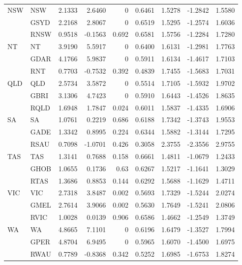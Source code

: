 \begin{table}[htbp]
{\begin{tabular}{llrrrrrrr}
    \multirow{3}[0]{*}{NSW} & NSW   & 2.1333 & 2.6460 & 0     & 0.6461 & 1.5278 & -1.2842 & 1.5580 \\
          & GSYD  & 2.2168 & 2.8067 & 0     & 0.6519 & 1.5295 & -1.2574 & 1.6036 \\
          & RNSW  & 0.9518 & -0.1563 & 0.692 & 0.6581 & 1.5756 & -1.2284 & 1.7280 \\
    \multirow{3}[0]{*}{NT} & NT    & 3.9190 & 5.5917 & 0     & 0.6400 & 1.6131 & -1.2981 & 1.7763 \\
          & GDAR  & 4.1766 & 5.9837 & 0     & 0.5911 & 1.6134 & -1.4617 & 1.7103 \\
          & RNT   & 0.7703 & -0.7532 & 0.392 & 0.4839 & 1.7455 & -1.5683 & 1.7031 \\
    \multirow{3}[0]{*}{QLD} & QLD   & 2.5734 & 3.5872 & 0     & 0.5514 & 1.7105 & -1.5932 & 1.9702 \\
          & GBRI  & 3.1306 & 4.7423 & 0     & 0.5910 & 1.6443 & -1.4526 & 1.8635 \\
          & RQLD  & 1.6948 & 1.7847 & 0.024 & 0.6011 & 1.5837 & -1.4335 & 1.6906 \\
    \multirow{3}[0]{*}{SA} & SA    & 1.0761 & 0.2219 & 0.686 & 0.6188 & 1.7342 & -1.3743 & 1.9553 \\
          & GADE  & 1.3342 & 0.8995 & 0.224 & 0.6344 & 1.5882 & -1.3144 & 1.7295 \\
          & RSAU  & 0.7098 & -1.0701 & 0.426 & 0.3058 & 2.3755 & -2.3556 & 2.9755 \\
    \multirow{3}[0]{*}{TAS} & TAS   & 1.3141 & 0.7688 & 0.158 & 0.6661 & 1.4811 & -1.0679 & 1.2433 \\
          & GHOB  & 1.0655 & 0.1736 & 0.63  & 0.6267 & 1.5217 & -1.1641 & 1.3029 \\
          & RTAS  & 1.3686 & 0.8853 & 0.144 & 0.6292 & 1.5688 & -1.1629 & 1.4711 \\
    \multirow{3}[0]{*}{VIC} & VIC   & 2.7318 & 3.8487 & 0.002 & 0.5693 & 1.7329 & -1.5244 & 2.0274 \\
          & GMEL  & 2.7614 & 3.9066 & 0.002 & 0.5630 & 1.7649 & -1.5241 & 2.0806 \\
          & RVIC  & 1.0028 & 0.0139 & 0.906 & 0.6586 & 1.4662 & -1.2549 & 1.3749 \\
    \multirow{3}[1]{*}{WA} & WA    & 4.8665 & 7.1101 & 0     & 0.6196 & 1.6479 & -1.3527 & 1.7994 \\
          & GPER  & 4.8704 & 6.9495 & 0     & 0.5965 & 1.6070 & -1.4500 & 1.6975 \\
          & RWAU  & 0.7789 & -0.8368 & 0.342 & 0.5252 & 1.6985 & -1.6753 & 1.8274 \\
   
  

  
    \bottomrule
    \end{tabular}%
  \label{tab:results_q_r}%
  
  }
\end{table}%
